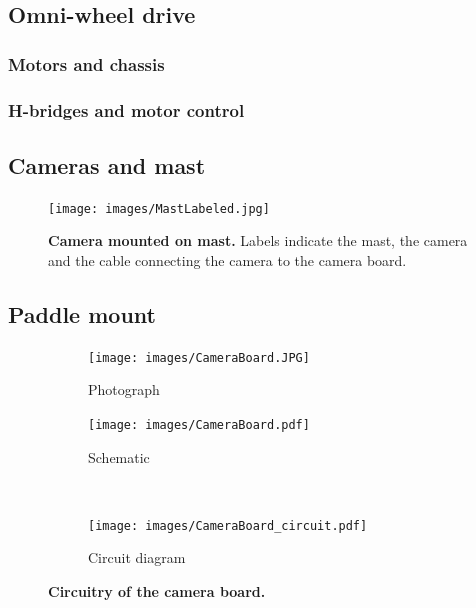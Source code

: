 \documentclass[letterpaper, 11pt]{article}
\begin{document}
\begin{enumerate}[label=\textbf{\arabic*.}]
\subsection{Omni-wheel drive}
\subsubsection{Motors and chassis}
\subsubsection{H-bridges and motor control}

\subsection{Cameras and mast}

\begin{figure}[ht]
    \centering
    \texttt{[image: images/MastLabeled.jpg]}
    \caption{\textbf{Camera mounted on mast.} Labels indicate the mast, the camera and the cable connecting the camera to the camera board.}
    \label{fig:mast}
\end{figure}


\subsection{Paddle mount}

\begin{figure}[ht]
    \centering
    \begin{subfigure}[b]{0.45\textwidth}
        \centering
        \texttt{[image: images/CameraBoard.JPG]}
        \caption{Photograph}
    \end{subfigure}%
    \begin{subfigure}[b]{0.55\textwidth}
        \centering
        \texttt{[image: images/CameraBoard.pdf]}
        \caption{Schematic}
    \end{subfigure} \\ \vspace{1cm}
    \begin{subfigure}[b]{0.99\textwidth}
        \centering
        \texttt{[image: images/CameraBoard\_circuit.pdf]}
        \caption{Circuit diagram}
    \end{subfigure}
    \caption{\textbf{Circuitry of the camera board.}}
    \label{fig:cameraboard}
\end{figure}


\end{enumerate}
\end{document}
